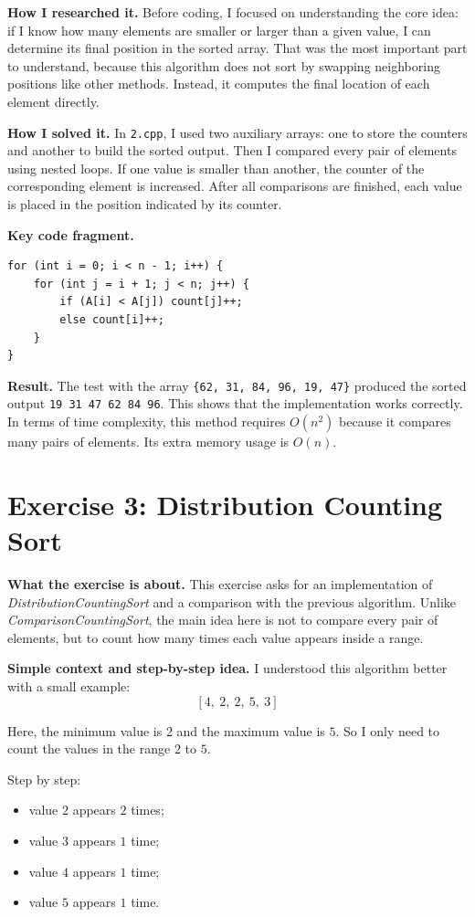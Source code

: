 \documentclass[12pt,a4paper]{article}
\begin{document}
\textbf{How I researched it.} Before coding, I focused on understanding the core idea: if I know how many elements are smaller or larger than a given value, I can determine its final position in the sorted array. That was the most important part to understand, because this algorithm does not sort by swapping neighboring positions like other methods. Instead, it computes the final location of each element directly.

\textbf{How I solved it.} In \texttt{2.cpp}, I used two auxiliary arrays: one to store the counters and another to build the sorted output. Then I compared every pair of elements using nested loops. If one value is smaller than another, the counter of the corresponding element is increased. After all comparisons are finished, each value is placed in the position indicated by its counter.

\textbf{Key code fragment.}
\begin{lstlisting}
for (int i = 0; i < n - 1; i++) {
    for (int j = i + 1; j < n; j++) {
        if (A[i] < A[j]) count[j]++;
        else count[i]++;
    }
}
\end{lstlisting}

\textbf{Result.} The test with the array \texttt{\{62, 31, 84, 96, 19, 47\}} produced the sorted output \texttt{19 31 47 62 84 96}. This shows that the implementation works correctly. In terms of time complexity, this method requires \(O(n^2)\) because it compares many pairs of elements. Its extra memory usage is \(O(n)\).

\section*{Exercise 3: Distribution Counting Sort}
\textbf{What the exercise is about.} This exercise asks for an implementation of \textit{DistributionCountingSort} and a comparison with the previous algorithm. Unlike \textit{ComparisonCountingSort}, the main idea here is not to compare every pair of elements, but to count how many times each value appears inside a range.

\textbf{Simple context and step-by-step idea.} I understood this algorithm better with a small example:
\[
[4,\ 2,\ 2,\ 5,\ 3]
\]

Here, the minimum value is \(2\) and the maximum value is \(5\). So I only need to count the values in the range \(2\) to \(5\).

Step by step:
\begin{itemize}
\item value \(2\) appears \(2\) times;
\item value \(3\) appears \(1\) time;
\item value \(4\) appears \(1\) time;
\item value \(5\) appears \(1\) time.
\end{itemize}
\end{document}

